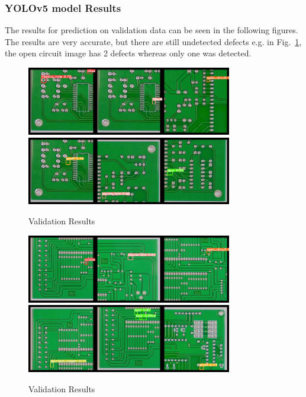 \documentclass[12pt]{article}
\begin{document}
\subsubsection{YOLOv5 model Results}
The results for prediction on validation data can be seen in the following figures. The results are very accurate, but there are still undetected defects e.g. in Fig.~\ref{fig:results1_yolo}, the open circuit image has 2 defects whereas only one was detected.
\begin{figure}[h]
    \centering
    \includegraphics[width=0.8\textwidth]{./graphics/results1_yolo.png}
    \includegraphics[width=0.8\textwidth]{./graphics/results2_yolo.png}
    \caption{Validation Results}
    \label{fig:results1_yolo}
\end{figure}
\begin{figure}[h]
    \centering
    \includegraphics[width=0.8\textwidth]{./graphics/results3_yolo.png}
    \includegraphics[width=0.8\textwidth]{./graphics/results4_yolo.png}
    \caption{Validation Results}
    \label{fig:results2_yolo}
\end{figure}
\end{document}

